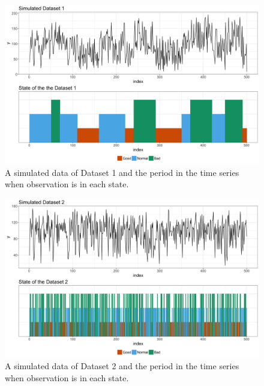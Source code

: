 \documentclass{beamer}
\begin{document}
\begin{frame}

\begin{figure}
	\includegraphics[width=1\linewidth]{sim1}
	\caption{A simulated data of Dataset 1 and the period in the time series when observation is in each state.}
\end{figure}

\end{frame}

\begin{frame}

\begin{figure}
	\includegraphics[width=1\linewidth]{sim2}
	\caption{A simulated data of Dataset 2 and the period in the time series when observation is in each state.}
\end{figure}

\end{frame}
\end{document}

